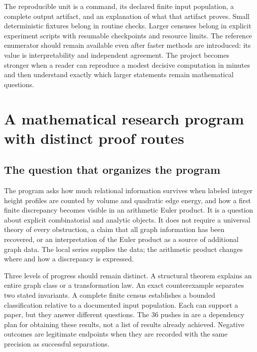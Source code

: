 \documentclass[
  11pt,
  a4paper,
]{report}
\let\singularitytexttt\texttt
\renewcommand{\texttt}[1]{\singularitytexttt{\seqsplit{#1}}}
\begin{document}
The reproducible unit is a command, its declared finite input
population, a complete output artifact, and an explanation of what that
artifact proves. Small deterministic fixtures belong in routine checks.
Larger censuses belong in explicit experiment scripts with resumable
checkpoints and resource limits. The reference enumerator should remain
available even after faster methods are introduced: its value is
interpretability and independent agreement. The project becomes stronger
when a reader can reproduce a modest decisive computation in minutes and
then understand exactly which larger statements remain mathematical
questions.

\hypertarget{a-mathematical-research-program-with-distinct-proof-routes}{%
\chapter{A mathematical research program with distinct proof
routes}\label{a-mathematical-research-program-with-distinct-proof-routes}}

\hypertarget{the-question-that-organizes-the-program}{%
\section{The question that organizes the
program}\label{the-question-that-organizes-the-program}}

The program asks how much relational information survives when labeled
integer height profiles are counted by volume and quadratic edge energy,
and how a first finite discrepancy becomes visible in an arithmetic
Euler product. It is a question about explicit combinatorial and
analytic objects. It does not require a universal theory of every
obstruction, a claim that all graph information has been recovered, or
an interpretation of the Euler product as a source of additional graph
data. The local series supplies the data; the arithmetic product changes
where and how a discrepancy is expressed.

Three levels of progress should remain distinct. A structural theorem
explains an entire graph class or a transformation law. An exact
counterexample separates two stated invariants. A complete finite census
establishes a bounded classification relative to a documented input
population. Each can support a paper, but they answer different
questions. The 36 pushes in \texttt{docs/development/PUSHES.md} are a
dependency plan for obtaining these results, not a list of results
already achieved. Negative outcomes are legitimate endpoints when they
are recorded with the same precision as successful separations.
\end{document}
